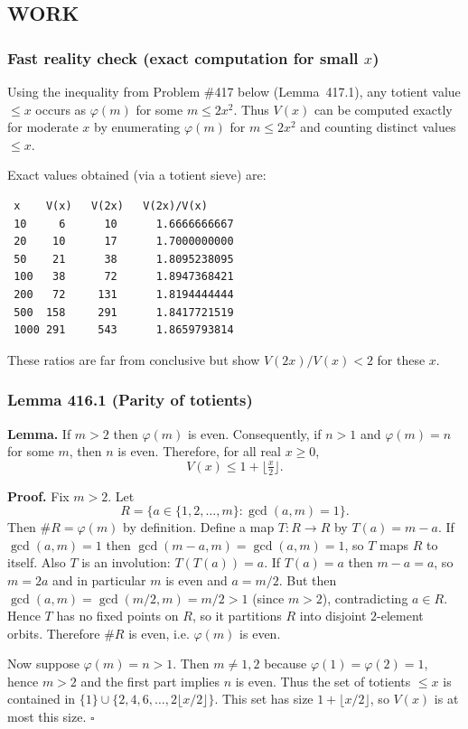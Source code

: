 \subsection*{WORK}
\subsubsection*{Fast reality check (exact computation for small $x$)}
Using the inequality from Problem \#417 below (Lemma~417.1), any totient value $\le x$ occurs as $\varphi(m)$ for some $m\le 2x^2$. Thus $V(x)$ can be computed exactly for moderate $x$ by enumerating $\varphi(m)$ for $m\le 2x^2$ and counting distinct values $\le x$.

Exact values obtained (via a totient sieve) are:
\begin{verbatim}
 x    V(x)   V(2x)   V(2x)/V(x)
 10     6      10      1.6666666667
 20    10      17      1.7000000000
 50    21      38      1.8095238095
 100   38      72      1.8947368421
 200   72     131      1.8194444444
 500  158     291      1.8417721519
 1000 291     543      1.8659793814
\end{verbatim}
These ratios are far from conclusive but show $V(2x)/V(x)<2$ for these $x$.

\subsubsection*{Lemma 416.1 (Parity of totients)}
\textbf{Lemma.} If $m>2$ then $\varphi(m)$ is even. Consequently, if $n>1$ and $\varphi(m)=n$ for some $m$, then $n$ is even. Therefore, for all real $x\ge 0$,
\[
V(x)\le 1+\big\lfloor \tfrac{x}{2}\big\rfloor.
\]

\textbf{Proof.}
Fix $m>2$. Let
\[
R=\{a\in\{1,2,\dots,m\}: \gcd(a,m)=1\}.
\]
Then $\#R=\varphi(m)$ by definition.
Define a map $T:R\to R$ by $T(a)=m-a$.
If $\gcd(a,m)=1$ then $\gcd(m-a,m)=\gcd(a,m)=1$, so $T$ maps $R$ to itself.
Also $T$ is an involution: $T(T(a))=a$.
If $T(a)=a$ then $m-a=a$, so $m=2a$ and in particular $m$ is even and $a=m/2$.
But then $\gcd(a,m)=\gcd(m/2,m)=m/2>1$ (since $m>2$), contradicting $a\in R$.
Hence $T$ has no fixed points on $R$, so it partitions $R$ into disjoint $2$-element orbits. Therefore $\#R$ is even, i.e. $\varphi(m)$ is even.

Now suppose $\varphi(m)=n>1$. Then $m\ne 1,2$ because $\varphi(1)=\varphi(2)=1$, hence $m>2$ and the first part implies $n$ is even.
Thus the set of totients $\le x$ is contained in $\{1\}\cup\{2,4,6,\dots,2\lfloor x/2\rfloor\}$.
This set has size $1+\lfloor x/2\rfloor$, so $V(x)$ is at most this size.
\hfill$\square$

